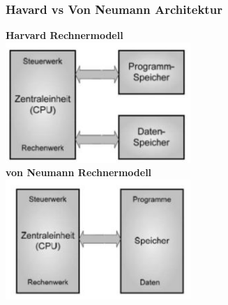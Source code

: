 \subsubsection{Havard vs Von Neumann Architektur}
\begin{multicols}{2}
    \textbf{Harvard Rechnermodell}\\
    \includegraphics[width=7cm]{images/HavardArchi}
    \\	
    \textbf{von Neumann Rechnermodell}\\
    \includegraphics[width=7cm]{images/NeumannArchi}
\end{multicols}
\clearpage

